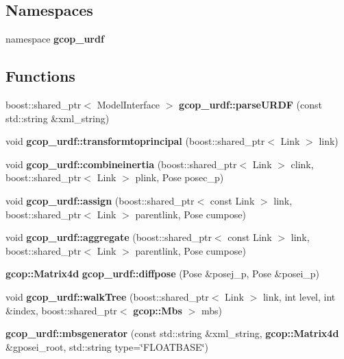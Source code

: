 \subsection*{\-Namespaces}
\begin{DoxyCompactItemize}
\item 
namespace {\bf gcop\-\_\-urdf}
\end{DoxyCompactItemize}
\subsection*{\-Functions}
\begin{DoxyCompactItemize}
\item 
boost\-::shared\-\_\-ptr$<$ \-Model\-Interface $>$ {\bf gcop\-\_\-urdf\-::parse\-U\-R\-D\-F} (const std\-::string \&xml\-\_\-string)
\item 
void {\bf gcop\-\_\-urdf\-::transformtoprincipal} (boost\-::shared\-\_\-ptr$<$ \-Link $>$ link)
\item 
void {\bf gcop\-\_\-urdf\-::combineinertia} (boost\-::shared\-\_\-ptr$<$ \-Link $>$ clink, boost\-::shared\-\_\-ptr$<$ \-Link $>$ plink, \-Pose posec\-\_\-p)
\item 
void {\bf gcop\-\_\-urdf\-::assign} (boost\-::shared\-\_\-ptr$<$ const \-Link $>$ link, boost\-::shared\-\_\-ptr$<$ \-Link $>$ parentlink, \-Pose cumpose)
\item 
void {\bf gcop\-\_\-urdf\-::aggregate} (boost\-::shared\-\_\-ptr$<$ const \-Link $>$ link, boost\-::shared\-\_\-ptr$<$ \-Link $>$ parentlink, \-Pose cumpose)
\item 
{\bf gcop\-::\-Matrix4d} {\bf gcop\-\_\-urdf\-::diffpose} (\-Pose \&posej\-\_\-p, \-Pose \&posei\-\_\-p)
\item 
void {\bf gcop\-\_\-urdf\-::walk\-Tree} (boost\-::shared\-\_\-ptr$<$ \-Link $>$ link, int level, int \&index, boost\-::shared\-\_\-ptr$<$ {\bf gcop\-::\-Mbs} $>$ mbs)
\item 
{\bf gcop\-\_\-urdf\-::mbsgenerator} (const std\-::string \&xml\-\_\-string, {\bf gcop\-::\-Matrix4d} \&gposei\-\_\-root, std\-::string type=\char`\"{}\-F\-L\-O\-A\-T\-B\-A\-S\-E\char`\"{})
\end{DoxyCompactItemize}
